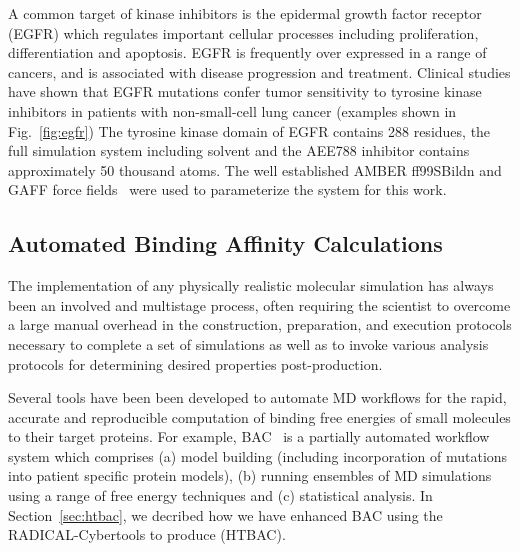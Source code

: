 \documentclass{bmcart}
\def\texttt{[image: ]}
\begin{document}


A common target of kinase inhibitors is the epidermal growth factor receptor
(EGFR) which regulates important cellular processes including proliferation,
differentiation and apoptosis. EGFR is frequently over expressed in a range of
cancers, and is associated with disease progression and treatment. Clinical
studies have shown that EGFR mutations confer tumor sensitivity to tyrosine
kinase inhibitors in patients with non-small-cell lung cancer (examples shown
in Fig.~\ref{fig:egfr}) The tyrosine kinase domain of EGFR contains 288
residues, the full simulation system including solvent and the AEE788
inhibitor contains approximately 50 thousand atoms. The well established AMBER
ff99SBildn and GAFF force fields~\cite{Maier2015, Wang2004} were used to
parameterize the system for this work.

\subsection*{Automated Binding Affinity Calculations}

The implementation of any physically realistic molecular simulation has
always been an involved and multistage process, often requiring the scientist
to overcome a large manual overhead in the construction, preparation, and
execution protocols necessary to complete a set of simulations as well as to
invoke various analysis protocols for determining desired properties
post-production.

Several tools have been been developed to automate MD workflows for the
rapid, accurate and reproducible computation of binding free energies of
small molecules to their target proteins. For example, BAC~\cite{Sadiq2008}
is a partially automated workflow system which comprises (a) model building
(including incorporation of mutations into patient specific protein models),
(b) running ensembles of MD simulations using a range of free energy
techniques and (c) statistical analysis. In Section~\ref{sec:htbac}, we decribed
how we have enhanced BAC using the RADICAL-Cybertools to produce (HTBAC).
\end{document}
